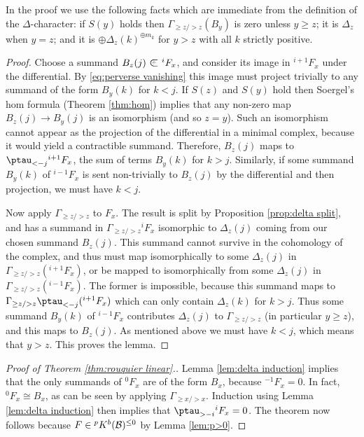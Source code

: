 \documentclass[11pt]{amsart}
\numberwithin{equation}{section}
\def\to{\rightarrow}
\def\summand{
\mathbin{\tikz [baseline=-3pt]
{
\clip (-0.2,-0.15) rectangle (0.2,0.15);
\node[scale=1.2] at (0,0) {$\subset$}; \node[scale=0.5] at
  (0,0) {$\oplus$}; }}
}
\theoremstyle{definition}
\theoremstyle{remark}
\begin{document}
{In the proof we use the following facts which are immediate from the
definition of the $\Delta$-character: if $S(y)$ holds then $\Gamma_{\ge
z/>z}(B_y)$ is zero unless $y \ge z$; it is $\Delta_z$ when $y=z$; and it is $\oplus \Delta_z(k)^{\oplus m_k}$ for $y>z$ with all $k$ strictly positive. 

\begin{proof}
Choose a summand $B_z(j) \summand {}^iF_x$, and consider its image in
${}^{i+1}F_x$ under the differential. By \eqref{eq:perverse vanishing}
this image must project trivially to any summand of the form $B_y(k)$
for $k<j$. If $S(z)$ and $S(y)$ hold
then Soergel's hom formula (Theorem \ref{thm:hom}) implies that any non-zero map $B_z(j) \to
B_y(j)$ is an isomorphism (and so $z = y$). Such an isomorphism cannot
appear as the projection of the differential in a minimal complex,
because it would yield a contractible summand. Therefore, $B_z(j)$
maps to 
$\ptau_{<-j} {}^{i+1}F_x$, the sum of terms $B_y(k)$ for $k>j$. Similarly, if some summand $B_y(k)$ of ${}^{i-1}F_x$ is sent non-trivially to $B_z(j)$ by the differential and then projection,
we must have $k<j$.

Now apply $\Gamma_{\ge z/>z}$ to $F_x$. The result is split by Proposition \ref{prop:delta split}, and has a summand in $\Gamma_{\ge z/>z}{}^iF_x$ isomorphic to $\Delta_z(j)$ coming from
our chosen summand $B_z(j)$. This summand cannot survive in the cohomology of the complex,
and thus must map isomorphically to some $\Delta_z(j)$ in $\Gamma_{\ge z/>z}({}^{i+1}F_x)$, or be mapped to isomorphically from some $\Delta_z(j)$ in $\Gamma_{\ge z/>z}({}^{i-1}F_x)$. The former
is impossible, because this summand maps to $\Gamma_{\ge z/>z}
\ptau_{<-j} ({}^{i+1}F_x)$ which can only contain $\Delta_z(k)$ for
$k>j$. Thus some summand $B_y(k)$ of ${}^{i-1}F_x$ contributes
$\Delta_z(j)$ to $\Gamma_{\ge z/>z}$ (in particular $y \ge z$), and
this maps to $B_z(j)$. As mentioned above we must have $k<j$, which
means that $y > z$. This proves the lemma. \end{proof}  

\begin{proof}[Proof of Theorem \ref{thm:rouquier linear}.] Lemma \ref{lem:delta induction} implies that the only summands of ${}^0F_x$ are of the form $B_x$, because
$^{-1}F_x=0$. In fact, $^0F_x \cong B_x$, as can be seen by applying
$\Gamma_{\ge x/>x}$. Induction using Lemma \ref{lem:delta induction}
then implies that $\ptau_{> -i}{}^iF_x = 0$. The theorem now follows
because $F \in {}^p K^b({\mathcal{B}})^{\le 0}$ by Lemma \ref{lem:p>0}. \end{proof}


}
\end{document}
